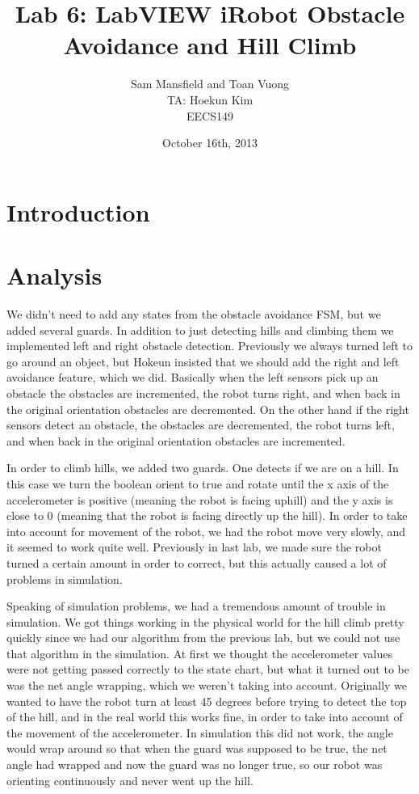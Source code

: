 \documentclass[10pt,titlepage]{article}
\begin{document}
  \title{Lab 6: LabVIEW iRobot Obstacle Avoidance and Hill Climb}
  \author{Sam Mansfield and Toan Vuong \\
          TA: Hoekun Kim \\
          EECS149}
  \date{October 16th, 2013}
  \maketitle

  \section{Introduction}

  \section{Analysis}
    
    We didn't need to add any states from the obstacle avoidance FSM, but we added several guards. In addition to just detecting hills and climbing them we implemented left and right obstacle detection. Previously we always turned left to go around an object, but Hokeun insisted that we should add the right and left avoidance feature, which we did. Basically when the left sensors pick up an obstacle the obstacles are incremented, the robot turns right, and when back in the original orientation obstacles are decremented. On the other hand if the right sensors detect an obstacle, the obstacles are decremented, the robot turns left, and when back in the original orientation obstacles are incremented. 

    In order to climb hills, we added two guards. One detects if we are on a hill. In this case we turn the boolean orient to true and rotate until the x axis of the accelerometer is positive (meaning the robot is facing uphill) and the y axis is close to 0 (meaning that the robot is facing directly up the hill). In order to take into account for movement of the robot, we had the robot move very slowly, and it seemed to work quite well. Previously in last lab, we made sure the robot turned a certain amount in order to correct, but this actually caused a lot of problems in simulation.


    Speaking of simulation problems, we had a tremendous amount of trouble in simulation. We got things working in the physical world for the hill climb pretty quickly since we had our algorithm from the previous lab, but we could not use that algorithm in the simulation. At first we thought the accelerometer values were not getting passed correctly to the state chart, but what it turned out to be was the net angle wrapping, which we weren't taking into account. Originally we wanted to have the robot turn at least 45 degrees before trying to detect the top of the hill, and in the real world this works fine, in order to take into account of the movement of the accelerometer. In simulation this did not work, the angle would wrap around so that when the guard was supposed to be true, the net angle had wrapped and now the guard was no longer true, so our robot was orienting continuously and never went up the hill.
\end{document}
